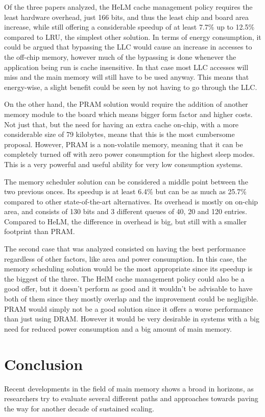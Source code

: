 \documentclass[journal]{IEEEtran}
\begin{document}
Of the three papers analyzed, the HeLM cache management policy requires the least hardware overhead, just 166 bits, and thus the least chip and board area increase, while still offering a considerable speedup of at least 7.7\% up to 12.5\% compared to LRU, the simplest other solution. In terms of energy consumption, it could be argued that bypassing the LLC would cause an increase in accesses to the off-chip memory, however much of the bypassing is done whenever the application being run is cache insensitive. In that case most LLC accesses will miss and the main memory will still have to be used anyway. This means that energy-wise, a slight benefit could be seen by not having to go through the LLC.

On the other hand, the PRAM solution would require the addition of another memory module to the board which means bigger form factor and higher costs. Not just that, but the need for having an extra cache on-chip, with a more considerable size of 79 kilobytes, means that this is the most cumbersome proposal. However, PRAM is a non-volatile memory, meaning that it can be completely turned off with zero power consumption for the highest sleep modes. This is a very powerful and useful ability for very low consumption systems.

The memory scheduler solution can be considered a middle point between the two previous onces. Its speedup is at least 6.4\% but can be as much as 25.7\% compared to other state-of-the-art alternatives. Its overhead is mostly on on-chip area, and consists of 130 bits and 3 different queues of 40, 20 and 120 entries. Compared to HeLM, the difference in overhead is big, but still with a smaller footprint than PRAM.

The second case that was analyzed consisted on having the best performance regardless of other factors, like area and power consumption. In this case, the memory scheduling solution would be the most appropriate since its speedup is the biggest of the three. The HelM cache management policy could also be a good offer, but it doesn't perform as good and it wouldn't be advisable to have both of them since they mostly overlap and the improvement could be negligible. PRAM would simply not be a good solution since it offers a worse performance than just using DRAM. However it would be very desirable in systems with a big need for reduced power consumption and a big amount of main memory.

\section{Conclusion}
Recent developments in the field of main memory shows a broad in horizons, as researchers try to evaluate several different paths and approaches towards paving the way for another decade of sustained scaling. 
\end{document}
